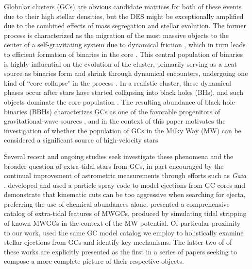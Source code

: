 \documentclass[twocolumn]{aastex631}
\begin{document}
Globular clusters (GCs) are obvious candidate matrices for both of these events due to their high stellar densities, but the DES might be exceptionally amplified due to the combined effects of mass segregation and stellar evolution.
The former process is characterized as the migration of the most massive objects to the center of a self-gravitating system due to dynamical friction \citep[e.g.,][]{2008gady.book.....B}, which in turn leads to efficient formation of binaries in the core \citep{2005MNRAS.358..572I}.
This central population of binaries is highly influential on the evolution of the cluster, primarily serving as a heat source as binaries form and shrink through dynamical encounters, undergoing one kind of ``core collapse" in the process \citep[e.g.][]{2007ApJ...658.1047F, 2013MNRAS.429.2881C}.
In a realistic cluster, these dynamical phases occur after stars have started collapsing into black holes (BHs), and such objects dominate the core population \citep{2020IAUS..351..357K}.
The resulting abundance of black hole binaries (BBHs) characterizes GCs as one of the favorable progenitors of gravitational-wave sources \citep{2000ApJ...528L..17P, 2015PhRvL.115e1101R}, and in the context of this paper motivates the investigation of whether the population of GCs in the Milky Way (MW) can be considered a significant source of high-velocity stars.

Several recent and ongoing studies seek investigate these phenomena and the broader question of extra-tidal stars from GCs, in part encouraged by the continual improvement of astrometric measurements through efforts such as \textit{Gaia} \citet{2022A&A...667A.148G}.
\citet{2023MNRAS.518.4249G} developed and used a particle spray code to model ejections from GC cores and demonstrate that kinematic cuts can be too aggressive when searching for ejecta, preferring the use of chemical abundances alone.
\citet{2023arXiv230105166F} presented a comprehensive catalog of extra-tidal features of MWGCs, produced by simulating tidal stripping of known MWGCs in the context of the MW potential.
Of particular proximity to our work, \citet{2022arXiv221116523W} used the same GC model catalog we employ to holistically examine stellar ejections from GCs and identify key mechanisms.
The latter two of of these works are explicitly presented as the first in a series of papers seeking to compose a more complete picture of their respective objects.
\end{document}
